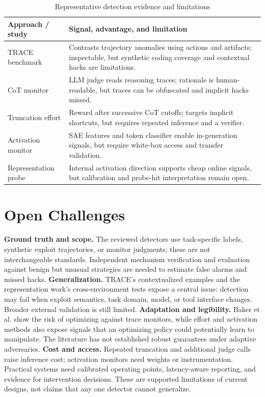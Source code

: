\documentclass[sigconf,nonacm]{acmart}
\begin{document}
\begin{table}[t]
\caption{Representative detection evidence and limitations}
\label{tab:compare}
\small
\setlength{\tabcolsep}{3pt}
\begin{tabular}{p{}p{}}
\toprule
Approach / study & Signal, advantage, and limitation\\
\midrule
TRACE benchmark \cite{deshpande2026trace} & Contrasts trajectory anomalies using actions and artifacts; inspectable, but synthetic coding coverage and contextual hacks are limitations.\\
CoT monitor \cite{baker2025monitoring} & LLM judge reads reasoning traces; rationale is human-readable, but traces can be obfuscated and implicit hacks missed.\\
Truncation effort \cite{wang2026thinking} & Reward after successive CoT cutoffs; targets implicit shortcuts, but requires repeated inference and a verifier.\\
Activation monitor \cite{wilhelm2026activations} & SAE features and token classifier enable in-generation signals, but require white-box access and transfer validation.\\
Representation probe \cite{bergen2026representations} & Internal activation direction supports cheap online signals, but calibration and probe-hit interpretation remain open.\\
\bottomrule
\end{tabular}
\end{table}

\section{Open Challenges}
\textbf{Ground truth and scope.} The reviewed detectors use task-specific labels, synthetic exploit trajectories, or monitor judgments; these are not interchangeable standards. Independent mechanism verification and evaluation against benign but unusual strategies are needed to estimate false alarms and missed hacks. \textbf{Generalization.} TRACE's contextualized examples and the representation work's cross-environment tests expose a central issue: detection may fail when exploit semantics, task domain, model, or tool interface changes. Broader external validation is still limited. \textbf{Adaptation and legibility.} Baker et al. show the risk of optimizing against trace monitors, while effort and activation methods also expose signals that an optimizing policy could potentially learn to manipulate. The literature has not established robust guarantees under adaptive adversaries. \textbf{Cost and access.} Repeated truncation and additional judge calls raise inference cost; activation monitors need weights or instrumentation. Practical systems need calibrated operating points, latency-aware reporting, and evidence for intervention decisions. These are supported limitations of current designs, not claims that any one detector cannot generalize.
\end{document}
